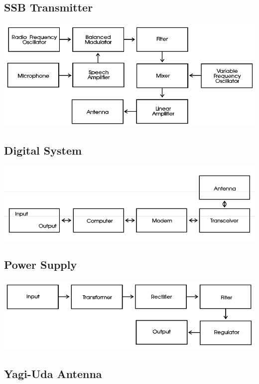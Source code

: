 \documentclass[letterpaper,12pt]{scrartcl}
\begin{document}
\subsection{SSB Transmitter}

\includegraphics[width=150mm]{ssb-transmitter.png}

\subsection{Digital System}

\includegraphics[width=150mm]{digital-system.png}

\subsection{Power Supply}

\includegraphics[width=150mm]{power-supply.png}

\subsection{Yagi-Uda Antenna}
\end{document}
